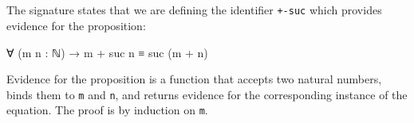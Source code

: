 \begin{fence}
\begin{code}
\>[0]\AgdaSpace{}%
\AgdaSymbol{(}\AgdaSpace{}%
\AgdaSymbol{)}\AgdaSpace{}%
\AgdaSpace{}%
\AgdaSymbol{=}\<%
\\
\>[0][@{}l@{\AgdaIndent{0}}]%
\>[2]\<%
\\
\>[2][@{}l@{\AgdaIndent{0}}]%
\>[4]\AgdaSpace{}%
\AgdaSpace{}%
\AgdaOperator{\AgdaPrimitive{+}}\AgdaSpace{}%
\AgdaSpace{}%
\<%
\\
%
\>[2]\<%
\\
\>[2][@{}l@{\AgdaIndent{0}}]%
\>[4]\AgdaSpace{}%
\AgdaSymbol{(}\AgdaSpace{}%
\AgdaOperator{\AgdaPrimitive{+}}\AgdaSpace{}%
\AgdaSpace{}%
\AgdaSymbol{)}\<%
\\
%
\>[2]\AgdaSpace{}%
\AgdaSpace{}%
\AgdaSpace{}%
\AgdaSymbol{(}\AgdaSpace{}%
\AgdaSpace{}%
\AgdaSymbol{)}\AgdaSpace{}%
\<%
\\
\>[2][@{}l@{\AgdaIndent{0}}]%
\>[4]\AgdaSpace{}%
\AgdaSymbol{(}\AgdaSpace{}%
\AgdaSymbol{(}\AgdaSpace{}%
\AgdaOperator{\AgdaPrimitive{+}}\AgdaSpace{}%
\AgdaSymbol{))}\<%
\\
%
\>[2]\<%
\\
\>[2][@{}l@{\AgdaIndent{0}}]%
\>[4]\AgdaSpace{}%
\AgdaSymbol{(}\AgdaSpace{}%
\AgdaSpace{}%
\AgdaOperator{\AgdaPrimitive{+}}\AgdaSpace{}%
\AgdaSymbol{)}\<%
\\
%
\>[2]\<%
\end{code}
\end{fence}

The signature states that we are defining the identifier \texttt{+-suc}
which provides evidence for the proposition:

\begin{myDisplay}
∀ (m n : ℕ) → m + suc n ≡ suc (m + n)
\end{myDisplay}

Evidence for the proposition is a function that accepts two natural
numbers, binds them to \texttt{m} and \texttt{n}, and returns evidence
for the corresponding instance of the equation. The proof is by
induction on \texttt{m}.

